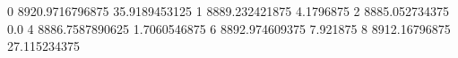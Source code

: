 0 8920.9716796875 35.9189453125
1 8889.232421875 4.1796875
2 8885.052734375 0.0
4 8886.7587890625 1.7060546875
6 8892.974609375 7.921875
8 8912.16796875 27.115234375
